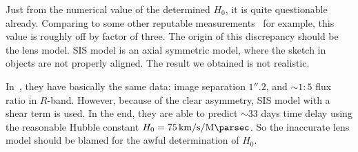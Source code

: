 Just from the numerical value of the determined $H_0$, it is quite questionable already. Comparing to some other reputable measurements~\cite{Aghanim:2018eyx}\cite{Riess:2019cxk} for example, this value is roughly off by factor of three. The origin of this discrepancy should be the lens model. SIS model is an axial symmetric model, where the sketch in~\cite{manual} objects are not properly aligned. The result we obtained is not realistic. 

In~\cite{Morgan:2003cf}, they have basically the same data: image separation $1''.2$, and $\sim 1:5$ flux ratio in $R$-band. However, because of the clear asymmetry, SIS model with a shear term is used. In the end, they are able to predict $\sim 33$ days time delay using the reasonable Hubble constant $H_0 = \SI{75}{\km\per\s\per\mega\parsec}$. So the inaccurate lens model should be blamed for the awful determination of $H_0$.
